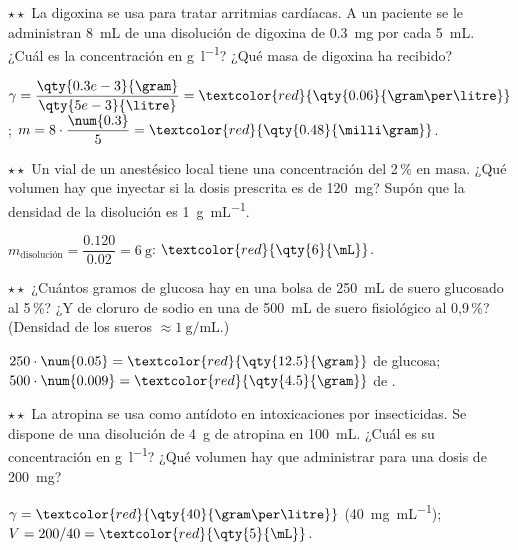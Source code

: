 \begin{exercise}
    \(\star\star\) La digoxina se usa para tratar arritmias cardíacas. A un paciente se le administran \qty{8}{\mL} de una
    disolución de digoxina de \qty{0.3}{\milli\gram} por cada \qty{5}{\mL}. ¿Cuál es la concentración en \unit{\gram\per\litre}?
    ¿Qué masa de digoxina ha recibido?
    \begin{solu}
        \(\gamma = \dfrac{\qty{0.3e-3}{\gram}}{\qty{5e-3}{\litre}} = \textcolor{red}{\qty{0.06}{\gram\per\litre}}\);
        \(m = 8 \cdot \dfrac{\num{0.3}}{5} = \textcolor{red}{\qty{0.48}{\milli\gram}}\).
    \end{solu}
\end{exercise}

\begin{exercise}
    \(\star\star\) Un vial de un anestésico local tiene una concentración del 2\,\% en masa. ¿Qué volumen hay que inyectar si la
    dosis prescrita es de \qty{120}{\milli\gram}? Supón que la densidad de la disolución es \qty{1}{\gram\per\mL}.
    \begin{solu}
        \(m_{\text{disolución}} = \dfrac{\num{0.120}}{\num{0.02}} = \qty{6}{\gram}\): \(\textcolor{red}{\qty{6}{\mL}}\).
    \end{solu}
\end{exercise}

\begin{exercise}
    \(\star\star\) ¿Cuántos gramos de glucosa hay en una bolsa de \qty{250}{\mL} de suero glucosado al 5\,\%? ¿Y de cloruro de
    sodio en una de \qty{500}{\mL} de suero fisiológico al 0,9\,\%? (Densidad de los sueros \(\approx \qty{1}{\gram\per\mL}\).)
    \begin{solu}
        \(250 \cdot \num{0.05} = \textcolor{red}{\qty{12.5}{\gram}}\) de glucosa; \(500 \cdot \num{0.009} = \textcolor{red}{\qty{4.5}{\gram}}\) de .
    \end{solu}
\end{exercise}

\begin{exercise}
    \(\star\star\) La atropina se usa como antídoto en intoxicaciones por insecticidas. Se dispone de una disolución de
    \qty{4}{\gram} de atropina en \qty{100}{\mL}. ¿Cuál es su concentración en \unit{\gram\per\litre}? ¿Qué volumen hay que
    administrar para una dosis de \qty{200}{\milli\gram}?
    \begin{solu}
        \(\gamma = \textcolor{red}{\qty{40}{\gram\per\litre}}\) (\qty{40}{\milli\gram\per\mL}); \(V = 200/40 = \textcolor{red}{\qty{5}{\mL}}\).
    \end{solu}
\end{exercise}

